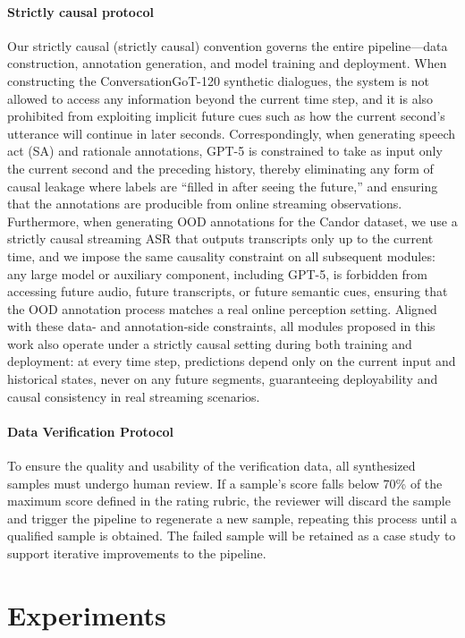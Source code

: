 \paragraph{Strictly causal protocol}
Our strictly causal (strictly causal) convention governs the entire pipeline—data construction, annotation generation, and model training and deployment. When constructing the ConversationGoT-120 synthetic dialogues, the system is not allowed to access any information beyond the current time step, and it is also prohibited from exploiting implicit future cues such as how the current second’s utterance will continue in later seconds. Correspondingly, when generating speech act (SA) and rationale annotations, GPT-5 is constrained to take as input only the current second and the preceding history, thereby eliminating any form of causal leakage where labels are “filled in after seeing the future,” and ensuring that the annotations are producible from online streaming observations. Furthermore, when generating OOD annotations for the Candor dataset, we use a strictly causal streaming ASR that outputs transcripts only up to the current time, and we impose the same causality constraint on all subsequent modules: any large model or auxiliary component, including GPT-5, is forbidden from accessing future audio, future transcripts, or future semantic cues, ensuring that the OOD annotation process matches a real online perception setting. Aligned with these data- and annotation-side constraints, all modules proposed in this work also operate under a strictly causal setting during both training and deployment: at every time step, predictions depend only on the current input and historical states, never on any future segments, guaranteeing deployability and causal consistency in real streaming scenarios.

\paragraph{Data Verification Protocol}
To ensure the quality and usability of the verification data, all synthesized samples must undergo human review. If a sample’s score falls below 70\% of the maximum score defined in the rating rubric, the reviewer will discard the sample and trigger the pipeline to regenerate a new sample, repeating this process until a qualified sample is obtained. The failed sample will be retained as a case study to support iterative improvements to the pipeline.


\section{Experiments}
